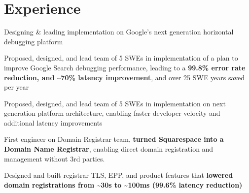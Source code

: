 \documentclass[]{two-column-resume}
\begin{document}
\begin{minipage}[t]{0.65\textwidth}

%
%
\section{Experience}

        \vspace{\topsep} %
        \begin{tightemize}
                            \item Designing \& leading implementation on Google's next generation horizontal debugging platform
                    \end{tightemize}
        \sectionsep
        \vspace{\topsep} %
        \begin{tightemize}
                            \item Proposed, designed, and lead team of 5 SWEs in implementation of a plan to improve Google Search debugging performance, leading to a \textbf{99.8\% error rate reduction, and \textasciitilde70\% latency improvement}, and over 25 SWE years saved per year
                            \item Proposed, designed, and lead team of 5 SWEs in implementation on next generation platform architecture, enabling faster developer velocity and additional latency improvements
                    \end{tightemize}
        \sectionsep
        \vspace{\topsep} %
        \begin{tightemize}
                            \item First engineer on Domain Registrar team, \textbf{turned Squarespace into a Domain Name Registrar}, enabling direct domain registration and management without 3rd parties.
                            \item Designed and built registrar TLS, EPP, and product features that \textbf{lowered domain registrations from \textasciitilde30s to \textasciitilde100ms (99.6\% latency reduction)}

\end{tightemize}
\end{minipage}
\end{document}
